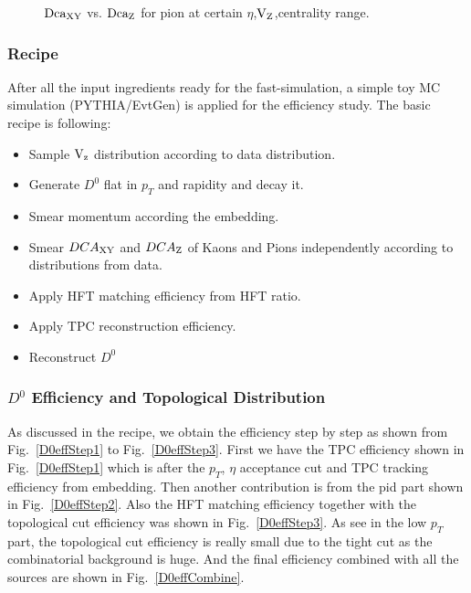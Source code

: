 \begin{figure}[htbp]
\begin{minipage}[htbp]{0.52\linewidth}
\caption{$\textup{Dca}_{\textup{XY}}$ vs. $\textup{Dca}_\textup{Z}$ for pion at certain $\eta$,$\textup{V}_{\textup{Z}}$,centrality range. \label{DcaExample}}
\end{minipage}
\end{figure}

\subsubsection{Recipe}
\label{recipe}
After all the input ingredients ready for the fast-simulation, a simple toy MC simulation (PYTHIA/EvtGen) is applied for the efficiency study. The basic recipe is following:
\begin{itemize}
\item Sample $\textup{V}_\textup{z}$ distribution according to data distribution.
\item Generate $D^0$ flat in $p_T$ and rapidity and decay it.
\item Smear momentum according the embedding.
\item Smear $DCA_{\textup{XY}}$ and $DCA_\textup{Z}$ of Kaons and Pions independently according to distributions from data.
\item Apply HFT matching efficiency from HFT ratio.
\item Apply TPC reconstruction efficiency.
\item Reconstruct $D^0$
\end{itemize}

\subsubsection{$D^0$ Efficiency and Topological Distribution}
\label{d0efficiencypart}

As discussed in the recipe, we obtain the efficiency step by step as shown from Fig.~\ref{D0effStep1} to Fig.~\ref{D0effStep3}. First we have the TPC efficiency shown in Fig.~\ref{D0effStep1} which is after the $p_T$, $\eta$ acceptance cut and TPC tracking efficiency from embedding. Then another contribution is from the pid part shown in Fig.~\ref{D0effStep2}. Also the HFT matching efficiency together with the topological cut efficiency was shown in Fig.~\ref{D0effStep3}. As see in the low $p_T$ part, the topological cut efficiency is really small due to the tight cut as the combinatorial background is huge. And the final efficiency combined with all the sources are shown in Fig.~\ref{D0effCombine}.

